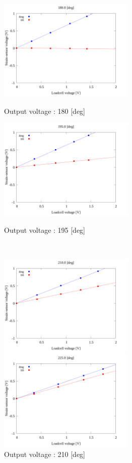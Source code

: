     \begin{figure}
      \begin{minipage}[b]{0.45\linewidth}
        \centering
        \includegraphics[width=65mm]{../../02_workspace/result/2-1/plot/04/04_linear_1800.png}
        \caption{Output voltage : 180 [deg]}
      \end{minipage}
      \begin{minipage}[b]{0.45\linewidth}
        \centering
        \includegraphics[width=65mm]{../../02_workspace/result/2-1/plot/04/04_linear_1950.png}
        \caption{Output voltage : 195 [deg]}
      \end{minipage}\\
      \begin{minipage}[b]{0.45\linewidth}
        \centering
        \includegraphics[width=65mm]{../../02_workspace/result/2-1/plot/04/04_linear_2100.png}
        \caption{Output voltage : 210 [deg]}
      \end{minipage}
      \begin{minipage}[b]{0.45\linewidth}
        \centering
        \includegraphics[width=65mm]{../../02_workspace/result/2-1/plot/04/04_linear_2250.png}

\end{minipage}
\end{figure}
